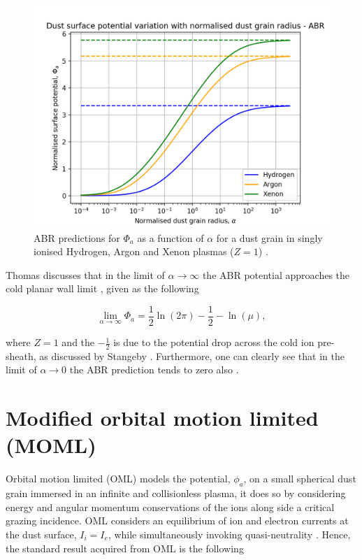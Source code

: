 \documentclass{article}
\begin{document}
\begin{figure}[H]
\centering
\includegraphics[width=\linewidth]{Output/ABRgraph.jpeg}
\caption{ABR predictions for $\Phi_a$ as a function of $\alpha$ for a dust grain in singly ionised Hydrogen, Argon and Xenon plasmas ($Z=1$) \cite{ABR} \cite{Thomas}.}
\label{ABR} 
\end{figure}

Thomas discusses that in the limit of $\alpha \to \infty$ the ABR potential approaches
the cold planar wall limit \cite{Thomas}, given as the following 

\begin{equation}\label{eq:ABRLim}
\lim_{\alpha \to \infty} \Phi_a = \frac{1}{2}\ln{\left(2 \pi \right)} - \frac{1}{2} - \ln{\left(\mu \right)},
\end{equation}

\smallskip

\noindent where $Z = 1$ and the $-\frac{1}{2}$ is due to the potential drop across the cold ion pre-sheath,
as discussed by Stangeby \cite{Stangeby1986} \cite{Stangeby2000}. Furthermore, one can clearly see that in the limit
of $\alpha \to 0$ the ABR prediction tends to zero also \cite{ABR}.

\section{Modified orbital motion limited (MOML)}

\smallskip

Orbital motion limited (OML) models the potential, $\phi_a$, on a small spherical
dust grain immersed in an infinite and collisionless plasma, it does so by considering
energy and angular momentum conservations of the ions along side a critical grazing incidence.
OML considers an equilibrium of ion and electron currents at the dust 
surface, $I_i = I_e$, while simultaneously invoking quasi-neutrality \cite{OriginalOML}.
Hence, the standard result acquired from OML is 
the following
\end{document}
